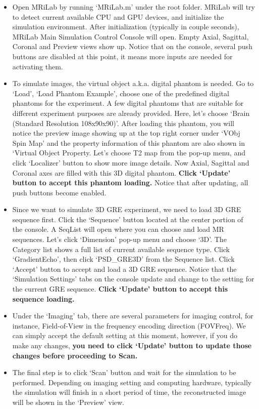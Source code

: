 \documentclass{book}%
\begin{document}
\begin{itemize}
\item Open MRiLab by running `MRiLab.m' under the root folder. MRiLab will try to detect current available CPU and GPU devices, and initialize the simulation environment. After initialization (typically in couple seconds), MRiLab Main Simulation Control Console will open. Empty Axial, Sagittal, Coronal and Preview views show up. Notice that on the console, several push buttons are disabled at this point, it means more inputs are needed for activating them.
\item To simulate images, the virtual object a.k.a. digital phantom is needed. Go to `Load', `Load Phantom Example', choose one of the predefined digital phantoms for the experiment. A few digital phantoms that are suitable for different experiment purposes are already provided. Here, let's choose `Brain (Standard Resolution 108x90x90)'. After loading this phantom, you will notice the preview image showing up at the top right corner under `VObj Spin Map' and the property information of this phantom are also shown in `Virtual Object Property. Let's choose T2 map from the pop-up menu, and click `Localizer' button to show more image details. Now Axial, Sagittal and Coronal axes are filled with this 3D digital phantom. \textbf{Click `Update' button to accept this phantom loading.} Notice that after updating, all push buttons become enabled.
\item Since we want to simulate 3D GRE experiment, we need to load 3D GRE sequence first. Click the `Sequence' button located at the center portion of the console. A SeqList will open where you can choose and load MR sequences. Let's click `Dimension' pop-up menu and choose `3D'. The Category list shows a full list of current available sequence type. Click `GradientEcho', then click `PSD\_GRE3D' from the Sequence list. Click `Accept' button to accept and load a 3D GRE sequence. Notice that the `Simulation Settings' tabs on the console update and change to the setting for the current GRE sequence. \textbf{Click `Update' button to accept this sequence loading.}
\item Under the `Imaging' tab, there are several parameters for imaging control, for instance, Field-of-View in the frequency encoding direction (FOVFreq). We can simply accept the default setting at this moment, however, if you do make any changes, \textbf{you need to click `Update' button to update those changes before proceeding to Scan.}
\item The final step is to click `Scan' button and wait for the simulation to be performed. Depending on imaging setting and computing hardware, typically the simulation will finish in a short period of time, the reconstructed image will be shown in the `Preview' view.
\end{itemize}
\end{document}
